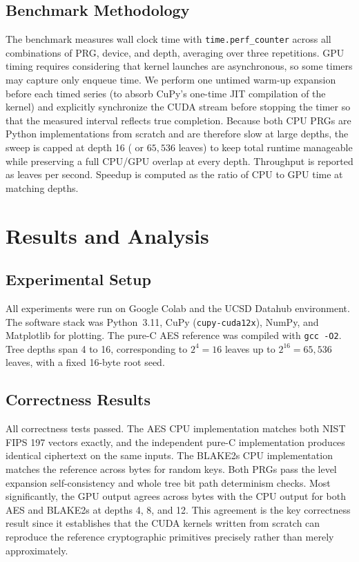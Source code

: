 \documentclass[conference]{IEEEtran}
\begin{document}
\subsection{Benchmark Methodology}
The benchmark measures wall clock time with \texttt{time.perf\_counter} across all combinations of PRG, device, and depth, averaging over three repetitions. GPU timing requires considering that kernel launches are asynchronous, so some timers may capture only enqueue time. We perform one untimed warm-up expansion before each timed series (to absorb CuPy's one-time JIT compilation of the kernel) and explicitly synchronize the CUDA stream before stopping the timer so that the measured interval reflects true completion. Because both CPU PRGs are Python implementations from scratch and are therefore slow at large depths, the sweep is capped at depth 16 ( or $65{,}536$ leaves) to keep total runtime manageable while preserving a full CPU/GPU overlap at every depth. Throughput is reported as leaves per second. Speedup is computed as the ratio of CPU to GPU time at matching depths.

\section{Results and Analysis}
\label{sec:results}

\subsection{Experimental Setup}
All experiments were run on Google Colab and the UCSD Datahub environment. The software stack was Python~3.11, CuPy (\texttt{cupy-cuda12x}), NumPy, and Matplotlib for plotting. The pure-C AES reference was compiled with \texttt{gcc -O2}. Tree depths span 4 to 16, corresponding to $2^4 = 16$ leaves up to $2^{16} = 65{,}536$ leaves, with a fixed 16-byte root seed.

\subsection{Correctness Results}
All correctness tests passed. The AES CPU implementation matches both NIST FIPS 197 vectors exactly, and the independent pure-C implementation produces identical ciphertext on the same inputs. The BLAKE2s CPU implementation matches the reference across bytes for random keys. Both PRGs pass the level expansion self-consistency and whole tree bit path determinism checks. Most significantly, the GPU output agrees across bytes with the CPU output for both AES and BLAKE2s at depths 4, 8, and 12. This agreement is the key correctness result since it establishes that the CUDA kernels written from scratch can reproduce the reference cryptographic primitives precisely rather than merely approximately.
\end{document}
